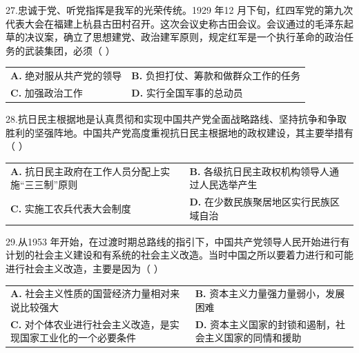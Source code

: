 \documentclass[UTF8,11pt]{ctexart}
\begin{document}
27.忠诚于党、听党指挥是我军的光荣传统。1929 年12 月下旬，红四军党的第九次代表大会在福建上杭县古田村召开。这次会议史称古田会议。会议通过的毛泽东起草的决议案，确立了思想建党、政治建军原则，规定红军是一个执行革命的政治任务的武装集团，必须（      ）


\begin{center}\begin{tabular}{>{\raggedright\arraybackslash}p{\dimexpr(\linewidth-4\tabcolsep)/2\relax}>{\raggedright\arraybackslash}p{\dimexpr(\linewidth-4\tabcolsep)/2\relax}}
\textbf{A.} 绝对服从共产党的领导 & \textbf{B.} 负担打仗、筹款和做群众工作的任务\\[.35em]
\textbf{C.} 加强政治工作 & \textbf{D.} 实行全国军事的总动员\\[.35em]\end{tabular}\end{center}

28.抗日民主根据地是认真贯彻和实现中国共产党全面战略路线、坚持抗争和争取胜利的坚强阵地。中国共产党高度重视抗日民主根据地的政权建设，其主要举措有（      ）


\begin{center}\begin{tabular}{>{\raggedright\arraybackslash}p{\dimexpr(\linewidth-4\tabcolsep)/2\relax}>{\raggedright\arraybackslash}p{\dimexpr(\linewidth-4\tabcolsep)/2\relax}}
\textbf{A.} 抗日民主政府在工作人员分配上实施“三三制”原则 & \textbf{B.} 各级抗日民主政权机构领导人通过人民选举产生\\[.35em]
\textbf{C.} 实施工农兵代表大会制度 & \textbf{D.} 在少数民族聚居地区实行民族区域自治\\[.35em]\end{tabular}\end{center}

29.从1953 年开始，在过渡时期总路线的指引下，中国共产党领导人民开始进行有计划的社会主义建设和有系统的社会主义改造。当时中国之所以要着力进行和可能进行社会主义改造，主要是因为（      ）


\begin{center}\begin{tabular}{>{\raggedright\arraybackslash}p{\dimexpr(\linewidth-4\tabcolsep)/2\relax}>{\raggedright\arraybackslash}p{\dimexpr(\linewidth-4\tabcolsep)/2\relax}}
\textbf{A.} 社会主义性质的国营经济力量相对来说比较强大 & \textbf{B.} 资本主义力量强力量弱小，发展困难\\[.35em]
\textbf{C.} 对个体农业进行社会主义改造，是实现国家工业化的一个必要条件 & \textbf{D.} 资本主义国家的封锁和遏制，社会主义国家的同情和援助\\[.35em]\end{tabular}\end{center}
\end{document}
